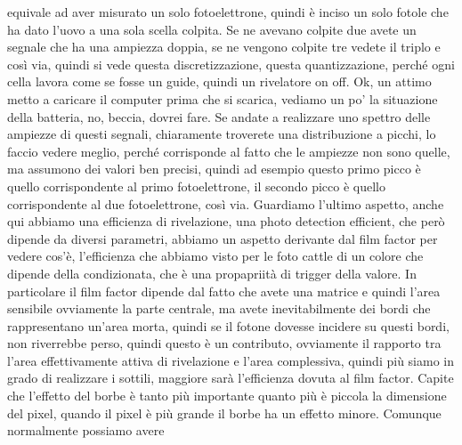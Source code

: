 {equivale ad aver misurato un solo fotoelettrone, quindi è inciso un solo fotole che ha dato l'uovo a una sola scella colpita. Se ne avevano colpite due avete un segnale che ha una ampiezza doppia, se ne vengono colpite tre vedete il triplo e così via, quindi si vede questa discretizzazione, questa quantizzazione, perché ogni cella lavora come se fosse un guide, quindi un rivelatore on off. Ok, un attimo metto a caricare il computer prima che si scarica, vediamo un po' la situazione della batteria, no, beccia, dovrei fare. Se andate a realizzare uno spettro delle ampiezze di questi segnali, chiaramente troverete una distribuzione a picchi, lo faccio vedere meglio, perché corrisponde al fatto che le ampiezze non sono quelle, ma assumono dei valori ben precisi, quindi ad esempio questo primo picco è quello corrispondente al primo fotoelettrone, il secondo picco è quello corrispondente al due fotoelettrone, così via. Guardiamo l'ultimo aspetto, anche qui abbiamo una efficienza di rivelazione, una photo detection efficient, che però dipende da diversi parametri, abbiamo un aspetto derivante dal film factor per vedere cos'è, l'efficienza che abbiamo visto per le foto cattle di un colore che dipende della condizionata, che è una propapriità di trigger della valore. In particolare il film factor dipende dal fatto che avete una matrice e quindi l'area sensibile ovviamente la parte centrale, ma avete inevitabilmente dei bordi che rappresentano un'area morta, quindi se il fotone dovesse incidere su questi bordi, non riverrebbe perso, quindi questo è un contributo, ovviamente il rapporto tra l'area effettivamente attiva di rivelazione e l'area complessiva, quindi più siamo in grado di realizzare i sottili, maggiore sarà l'efficienza dovuta al film factor. Capite che l'effetto del borbe è tanto più importante quanto più è piccola la dimensione del pixel, quando il pixel è più grande il borbe ha un effetto minore. Comunque normalmente possiamo avere

}
